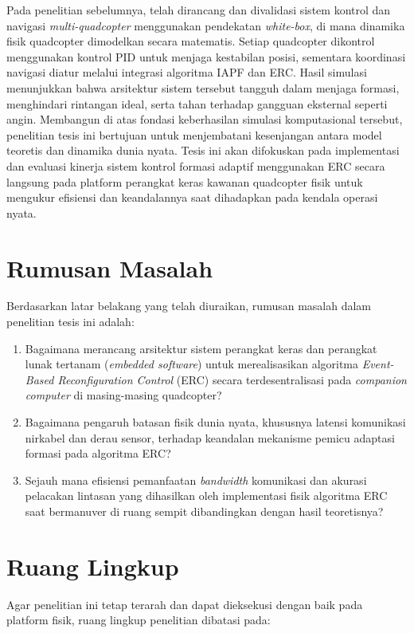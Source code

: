 \documentclass[12pt,a4paper]{report}
\numberwithin{equation}{chapter}
\begin{document}
Pada penelitian sebelumnya, telah dirancang dan divalidasi sistem kontrol dan navigasi \textit{multi-quadcopter} menggunakan pendekatan \textit{white-box}, di mana dinamika fisik quadcopter dimodelkan secara matematis. Setiap quadcopter dikontrol menggunakan kontrol PID untuk menjaga kestabilan posisi, sementara koordinasi navigasi diatur melalui integrasi algoritma IAPF dan ERC. Hasil simulasi menunjukkan bahwa arsitektur sistem tersebut tangguh dalam menjaga formasi, menghindari rintangan ideal, serta tahan terhadap gangguan eksternal seperti angin. Membangun di atas fondasi keberhasilan simulasi komputasional tersebut, penelitian tesis ini bertujuan untuk menjembatani kesenjangan antara model teoretis dan dinamika dunia nyata. Tesis ini akan difokuskan pada implementasi dan evaluasi kinerja sistem kontrol formasi adaptif menggunakan ERC secara langsung pada platform perangkat keras kawanan quadcopter fisik untuk mengukur efisiensi dan keandalannya saat dihadapkan pada kendala operasi nyata.

\section{Rumusan Masalah}
Berdasarkan latar belakang yang telah diuraikan, rumusan masalah dalam penelitian tesis ini adalah:

\begin{enumerate}
    \item Bagaimana merancang arsitektur sistem perangkat keras dan perangkat lunak tertanam (\textit{embedded software}) untuk merealisasikan algoritma \textit{Event-Based Reconfiguration Control} (ERC) secara terdesentralisasi pada \textit{companion computer}\label{abbr:cc} di masing-masing quadcopter?
    \item Bagaimana pengaruh batasan fisik dunia nyata, khususnya latensi komunikasi nirkabel dan derau sensor, terhadap keandalan mekanisme pemicu adaptasi formasi pada algoritma ERC?
    \item Sejauh mana efisiensi pemanfaatan \textit{bandwidth} komunikasi dan akurasi pelacakan lintasan yang dihasilkan oleh implementasi fisik algoritma ERC saat bermanuver di ruang sempit dibandingkan dengan hasil teoretisnya?
\end{enumerate}

\section{Ruang Lingkup}
Agar penelitian ini tetap terarah dan dapat dieksekusi dengan baik pada platform fisik, ruang lingkup penelitian dibatasi pada:
\end{document}
